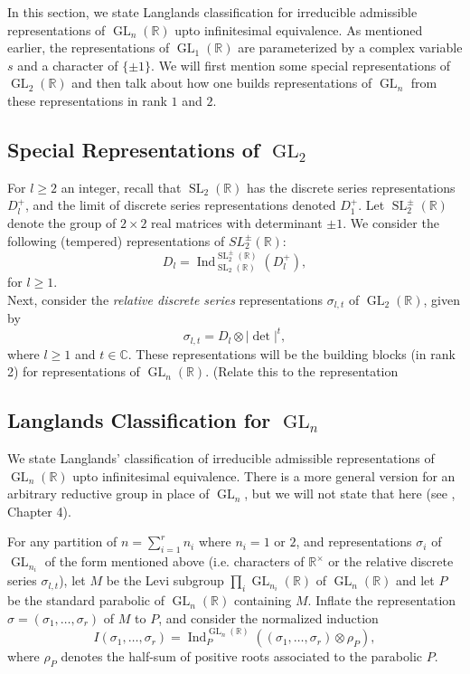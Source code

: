 \documentclass{amsart}
\numberwithin{equation}{section}
\theoremstyle{plain}
\theoremstyle{definition}
\theoremstyle{remark}
\renewcommand{\_}[2]{\underbrace{#1}_{#2}}
\renewcommand{\^}[2]{\overbrace{#1}_{#2}}
\newcommand{\R}{\mathbb{R}}
\newcommand{\C}{\mathbb{C}}
\newcommand{\Ind}{\operatorname{Ind}}
\newcommand{\GL}{\operatorname{GL}}
\newcommand{\SL}{\operatorname{SL}}
\begin{document}
In this section, we state Langlands classification for irreducible admissible representations of $\GL_n(\R)$ upto infinitesimal equivalence. As mentioned earlier, the representations of $\GL_1(\R)$ are parameterized by a complex variable $s$ and a character of $\{\pm 1\}$. We will first mention some special representations of $\GL_2(\R)$ and then talk about how one builds representations of $\GL_n$ from these representations in rank $1$ and $2$.

\subsection{Special Representations of $\GL_2$}

For $l\geq 2$ an integer, recall that $\SL_2(\R)$ has the discrete series representations $D_l^+$, and the limit of discrete series representations denoted $D_1^+$. Let $\SL_2^\pm(\R)$ denote the group of $2\times 2$ real matrices with determinant $\pm 1$. We consider the following (tempered) representations of $SL_2^\pm(\R)$: \[D_l = \Ind_{\SL_2(\R)}^{\SL_2^\pm(\R)}(D_l^+),\] for $l\geq 1$.\\
Next, consider the \emph{relative discrete series} representations $\sigma_{l,t}$ of $\GL_2(\R)$, given by \[\sigma_{l,t} = D_l \otimes |\det|^t,\] where $l \geq 1$ and $t \in \C$. These representations will be the building blocks (in rank 2) for representations of $\GL_n(\R)$. (Relate this to the representation

\subsection{Langlands Classification for $\GL_n$}
We state Langlands' classification of irreducible admissible representations of $\GL_n(\R)$ upto infinitesimal equivalence. There is a more general version for an arbitrary reductive group in place of $\GL_n$, but we will not state that here (see \cite{getzhahn}, Chapter 4).

For any partition of $n = \sum_{i=1}^r n_i$ where $n_i = 1$ or $2$, and representations $\sigma_i$ of $\GL_{n_i}$ of the form mentioned above (i.e. characters of $\R^\times$ or the relative discrete series $\sigma_{l,t}$), let $M$ be the Levi subgroup $\prod_i \GL_{n_i}(\R)$ of $\GL_n(\R)$ and let $P$ be the standard parabolic of $\GL_n(\R)$ containing $M$. Inflate the representation $\sigma = (\sigma_1, \dots, \sigma_r)$ of $M$ to $P$, and consider the normalized induction \[I(\sigma_1,\dots,\sigma_r) = \Ind_P^{\GL_n(\R)} \left( (\sigma_1, \dots, \sigma_r) \otimes \rho_P \right ),\] where $\rho_P$ denotes the half-sum of positive roots associated to the parabolic $P$. 
\end{document}
